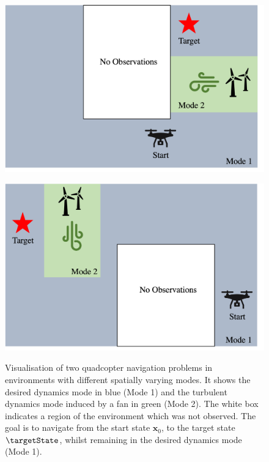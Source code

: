 \documentclass{mimosis-class/mimosis}
\numberwithin{equation}{chapter}
\newcommand{\state}{\ensuremath{\mathbf{x}}}
\begin{document}
{\begin{figure}[h!]
    \centering
    \begin{minipage}[r]{0.49\columnwidth}
        \includegraphics[width=\textwidth]{./images/quadcopter-domain-collocation-ppt.png}
        \label{fig-environment-1}
    \end{minipage}
    \begin{minipage}[r]{0.49\columnwidth}
        \includegraphics[width=\textwidth]{./images/quadcopter-domain-environment-2.png}
        \label{fig-environment-2}
    \end{minipage}
    \caption[Diagrams illustrating two quadcopter navigation problems]{Visualisation of two quadcopter navigation problems in environments with different spatially
    varying modes.
    It shows the desired dynamics mode in blue (Mode 1) and
    the turbulent dynamics mode induced by a fan in green (Mode 2).
    The white box indicates a region of the environment which was not observed.
    The goal is to navigate from the start state $\state_0$, to the target state $\targetState$, whilst remaining
    in the desired dynamics mode (Mode 1).}
    \label{fig-environments}
\end{figure}

}
\end{document}
